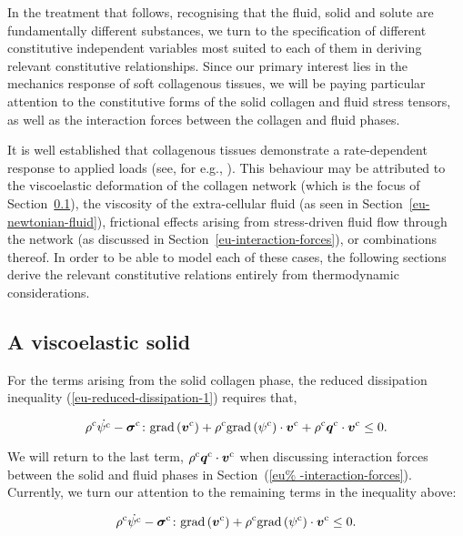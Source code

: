 In the treatment that follows, recognising that the fluid, solid and
solute are fundamentally different substances, we turn to the
specification of different constitutive independent variables most
suited to each of them in deriving relevant constitutive
relationships. Since our primary interest lies in the mechanics
response of soft collagenous tissues, we will be paying particular
attention to the constitutive forms of the solid collagen and fluid
stress tensors, as well as the interaction forces between the collagen
and fluid phases.

It is well established that collagenous tissues demonstrate a
rate-dependent response to applied loads (see, for e.g.,
\citet{Provenzanoetal:2001}). This behaviour may be attributed to the
viscoelastic deformation of the collagen network (which is the focus
of Section~\ref{eu-viscoelastic-solid}), the viscosity of the
extra-cellular fluid (as seen in Section~\ref{eu-newtonian-fluid}),
frictional effects arising from stress-driven fluid flow through the
network (as discussed in Section~\ref{eu-interaction-forces}), or
combinations thereof. In order to be able to model each of these
cases, the following sections derive the relevant constitutive
relations entirely from thermodynamic considerations.

\subsection{A viscoelastic solid}
\label{eu-viscoelastic-solid}

For the terms arising from the solid collagen phase, the reduced
dissipation inequality (\ref{eu-reduced-dissipation-1}) requires that,

\begin{equation*}
\rho^{\mathrm{c}} \dot{\psi^{\mathrm{c}}}
-\mbox{\boldmath$\sigma$}^{\mathrm{c}}\colon\mathrm{grad}\left(\mbox{\boldmath$ v$}^{\mathrm{c}}\right)+
\rho^{\mathrm{c}} \mathrm{grad}\left(\psi^{\mathrm{c}}\right)
\cdot\mbox{\boldmath$ v$}^{\mathrm{c}} +\rho^{\mathrm{c}}
\mbox{\boldmath$ q$}^{\mathrm{c}}\cdot\mbox{\boldmath$ v$}^{\mathrm{c}} \leq 0.
\end{equation*}

\noindent We will return to the last term, $\rho^{\mathrm{c}}
\mbox{\boldmath$ q$}^{\mathrm{c}}\cdot\mbox{\boldmath$ v$}^{\mathrm{c}}$ when discussing interaction
forces between the solid and fluid phases in Section~(\ref{eu%
  -interaction-forces}). Currently, we turn our attention to the
remaining terms in the inequality above:

\begin{equation}
\rho^{\mathrm{c}} \dot{\psi^{\mathrm{c}}}
-\mbox{\boldmath$\sigma$}^{\mathrm{c}}\colon\mathrm{grad} \left(\mbox{\boldmath$ v$}^{\mathrm{c}}\right)
+\rho^{\mathrm{c}} \mathrm{grad}\left(\psi^{\mathrm{c}}\right)
\cdot\mbox{\boldmath$ v$}^{\mathrm{c}} \leq 0.
\label{eu-reduced-dissipation-solid}
\end{equation}

